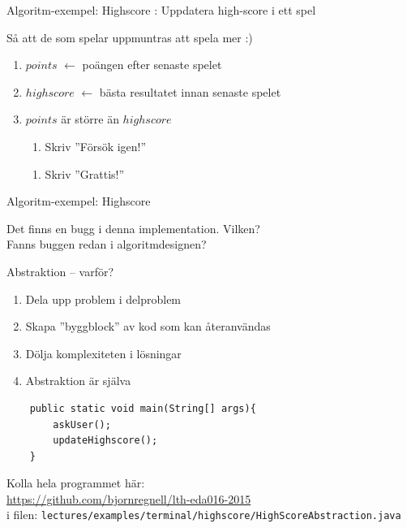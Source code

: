 \documentclass{lecturenotes}
\begin{document}
\begin{Slide}{Algoritm-exempel: Highscore}
: Uppdatera high-score i ett spel \\ \vspace{1em}

 \pause Så att de som spelar uppmuntras att spela mer :) \\ \vspace{1em}

\pause
\begin{enumerate}
\item $points$ $\leftarrow$ poängen efter senaste spelet
\item $highscore$ $\leftarrow$ bästa resultatet innan senaste spelet
\item {} $points$ är större än $highscore$ 
\begin{enumerate}[ ~~]
\item  Skriv ''Försök igen!''
\end{enumerate}
\begin{enumerate}[ ~~]
\item  Skriv ''Grattis!''
\end{enumerate}
\end{enumerate}
\pause
\scriptsize {}
\end{Slide}

\begin{Slide}{Algoritm-exempel: Highscore}

Det finns en bugg i denna implementation. Vilken? \\ Fanns buggen redan i algoritmdesignen?
\end{Slide}

\begin{Slide}{Abstraktion -- varför?}
\begin{enumerate}
\item Dela upp problem i delproblem
\item Skapa ''byggblock'' av kod som kan återanvändas
\item Dölja komplexiteten i lösningar
\item Abstraktion är själva 
\end{enumerate}
\begin{lstlisting}
    public static void main(String[] args){
    	askUser();
    	updateHighscore();
    }
\end{lstlisting}
Kolla hela programmet här:\\ \href{https://github.com/bjornregnell/lth-eda016-2015/blob/master/lectures/examples/terminal/highscore/HighScoreAbstraction.java}{https://github.com/bjornregnell/lth-eda016-2015} \\
i filen: \scriptsize\texttt{lectures/examples/terminal/highscore/HighScoreAbstraction.java}
\end{Slide}
\end{document}
